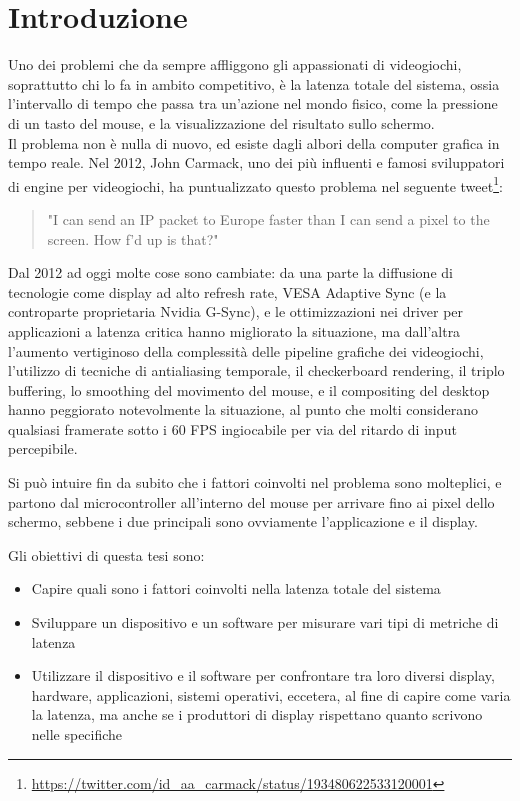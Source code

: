 \setlength{\parskip}{1em}
\setlength{\parindent}{0pt}
\chapter{Introduzione}
\label{chap:intro}

Uno dei problemi che da sempre affliggono gli appassionati di videogiochi, soprattutto chi lo fa in ambito competitivo, è la latenza totale del sistema, ossia l'intervallo di tempo che passa tra un'azione nel mondo fisico, come la pressione di un tasto del mouse, e la visualizzazione del risultato sullo schermo.\\
Il problema non è nulla di nuovo, ed esiste dagli albori della computer grafica in tempo reale. Nel 2012, John Carmack, uno dei più influenti e famosi sviluppatori di engine per videogiochi, ha puntualizzato questo problema nel seguente tweet\footnote{\href{https://twitter.com/id_aa_carmack/status/193480622533120001}{https://twitter.com/id\_aa\_carmack/status/193480622533120001}}:
\begin{quotation}
	"I can send an IP packet to Europe faster than I can send a pixel to the screen.  How f’d up is that?"
\end{quotation}
Dal 2012 ad oggi molte cose sono cambiate: da una parte la diffusione di tecnologie come display ad alto refresh rate, VESA Adaptive Sync (e la controparte proprietaria Nvidia G-Sync), e le ottimizzazioni nei driver per applicazioni a latenza critica hanno migliorato la situazione, ma dall'altra l'aumento vertiginoso della complessità delle pipeline grafiche dei videogiochi, l'utilizzo di tecniche di antialiasing temporale, il checkerboard rendering, il triplo buffering, lo smoothing del movimento del mouse, e il compositing del desktop hanno peggiorato notevolmente la situazione, al punto che molti considerano qualsiasi framerate sotto i 60 FPS ingiocabile per via del ritardo di input percepibile.

Si può intuire fin da subito che i fattori coinvolti nel problema sono molteplici, e partono dal microcontroller all'interno del mouse per arrivare fino ai pixel dello schermo, sebbene i due principali sono ovviamente l'applicazione e il display.

Gli obiettivi di questa tesi sono:
\begin{itemize}
	\item Capire quali sono i fattori coinvolti nella latenza totale del sistema
	\item Sviluppare un dispositivo e un software per misurare vari tipi di metriche di latenza
	\item Utilizzare il dispositivo e il software per confrontare tra loro diversi display, hardware, applicazioni, sistemi operativi, eccetera, al fine di capire come varia la latenza, ma anche se i produttori di display rispettano quanto scrivono nelle specifiche
\end{itemize} 

